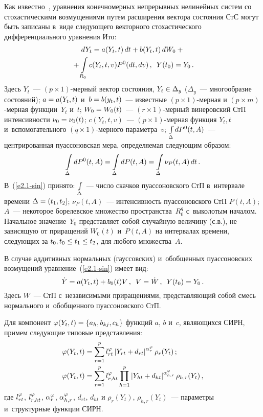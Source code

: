 \begin{multicols}{2}
Как известно~\cite{1-sin, 2-sin},  уравнения конечномерных непрерывных
нелинейных систем со стохастическими возмущениями путем расширения вектора
состояния СтС могут быть записаны в~виде сле\-ду\-юще\-го векторного стохастического
дифференциального уравнения Ито:
\begin{multline}
dY_t = a(Y_t, t)\, dt + b (Y_t, t) \,dW_0+ {}\\
{}+\int\limits_{R_0} c (Y_t, t, v) P^0 (dt, dv)\,,\enskip Y(t_0) = Y_0\,.\label{e2.1-sin}
\end{multline}
Здесь $Y_t$~--- $(p\times 1)$-мер\-ный вектор состояния, $Y_t \hm\in \Delta_y$
($\Delta_y$~--- многообразие состояний);  $a\hm=a(Y_t, t)$ и~$b\hm=b(y_t, t)$~---
известные  $(p\times 1)$-мер\-ная и  $(p\times m)$-мер\-ная функции~$Y_t$ и~$t$;
$W_0\hm= W_0(t)$~--- $(r\times 1)$-мер\-ный винеровский СтП интенсивности
$\nu_0 \hm= \nu_0(t)$; $c(Y_t, t, v)$~--- $(p\times 1)$-мер\-ная функция
$Y_t, t$ и~вспомогательного $(q\times 1)$-мер\-но\-го параметра~$v$;
$\int\limits\limits_{\Delta} dP^0 (t, A)$~--- центрированная пуассоновская мера,
опре\-де\-ля\-емая следующим образом:
\begin{equation*}
\int\limits\limits_{\Delta} dP^0 (t, A) = \int\limits\limits_{\Delta} dP (t,A) =\int\limits\limits_{\Delta} \nu_P (t,A)\, dt\,.
\end{equation*}
В~(\ref{e2.1-sin}) принято: $\int\limits\limits_{\Delta}$~---
число скачков пуассоновского СтП
в~интервале времени  $\Delta \hm= (t_1, t_2]$; $\nu_P (t, A)$~---
интенсивность пуассоновского СтП  $P(t,A)$; $A$~--- некоторое
борелевское множество пространства~$R_0^q$ с~выколотым началом.
Начальное значение~$Y_0$ представляет собой случайную величину
(с.в.), не зависящую от приращений $W_0(t)$ и~$P(t,A)$ на
интервалах времени, следующих за  $t_0, t_0\hm \le t_1\hm\le t_2$, для
любого множества~$A$.

В случае аддитивных нормальных (гауссовских) и~обобщенных пуассоновских
возмущений уравнение~(\ref{e2.1-sin}) имеет вид:
\begin{equation}
\dot Y = a(Y_t,t)+ b_0 (t) V\,, \enskip
V = \dot W\,,\enskip Y(t_0) = Y_0\,.\label{e2.3-sin}
\end{equation}
Здесь $W$~--- СтП с~независимыми приращениями, представляющий собой смесь
нормального и~обобщенного пуассоновского СтП.

Для компонент $\vrp(Y_t, t) \hm= \{a_h, b_{kj}, c_h\}$ функций $a$, $b$ и~$c$,
являющихся СИРН, примем следующие типовые представления:
\begin{align}
\varphi(Y_t, t) &= \sum\limits\limits_{r=1}^p l_{rt}^\varphi \left\vert
Y_{rt}+d_{rt}\right\vert^{\alpha_{r}^\varphi} \rho_r (Y_t)\,;\label{e2.4-sin}\\
\varphi(Y_t, t) &= \sum\limits\limits_{r=1}^p l_{r,ht}^\varphi
\prod\limits_{h=1}^p \left\vert Y_{ht}+d_{ht}\right\vert^{\alpha_{h,r}^\varphi}
\rho_{h,r} (Y_t)\,,\label{e2.5-sin}
\end{align}
где $l_{rt}^\varphi$, $l_{r,ht}^\varphi$, $\alpha_r^\varphi$, $\alpha_{h,r}^\varphi$,
$d_{rt}$, $d_{ht}$ и $\rho_{r}(Y_t)$, $\rho_{h,r}(Y_t)$~---
параметры и~структурные функции СИРН.


\end{multicols}
